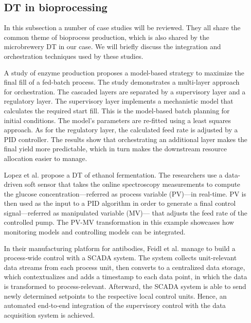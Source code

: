 \subsection{DT in bioprocessing} \label{sec:dtbio}
In this subsection a number of case studies will be reviewed. They all share the common theme of bioprocess production, which is also shared by the microbrewery DT in our case. We will briefly discuss the integration and orchestration techniques used by these studies.

A study of enzyme production \cite{Mears2017} proposes a model-based strategy to maximize the final fill of a fed-batch process. The study demonstrates a multi-layer approach for orchestration. The cascaded layers are separated by a supervisory layer and a regulatory layer. The supervisory layer implements a mechanistic model that calculates the required start fill. This is the model-based batch planning for initial conditions. The model's parameters are re-fitted using a least squares approach. As for the regulatory layer, the calculated feed rate is adjusted by a PID controller. The results show that orchestrating an additional layer makes the final yield more predictable, which in turn makes the downstream resource allocation easier to manage.

Lopez et al. \cite{Lopez2020} propose a DT of ethanol fermentation. The researchers use a data-driven soft sensor that takes the online spectroscopy measurements to compute the glucose  concentration---referred as process variable (PV)---in real-time. PV is then used as the input to a PID algorithm in order to generate a final control signal---referred as manipulated variable (MV)--- that adjusts the feed rate of the controlled pump. The PV-MV transformation in this example showcases how monitoring models and controlling models can be integrated.

In their manufacturing platform for antibodies, Feidl et al. \cite{Feidl2020} manage to build a process‐wide control with a SCADA system. The system collects unit-relevant data streams from each process unit, then converts to a centralized data storage, which contextualizes and adds a timestamp to each data point, in which the data is transformed to process-relevant. Afterward, the SCADA system is able to send newly determined setpoints to the respective local control units. Hence, an automated end‐to‐end integration of the supervisory control with the data acquisition system is achieved. 

